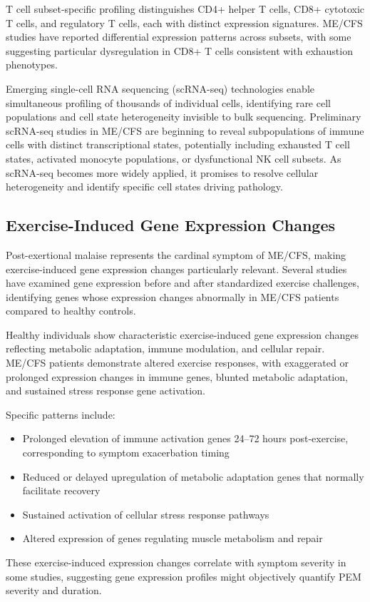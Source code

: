 T cell subset-specific profiling distinguishes CD4+ helper T cells, CD8+ cytotoxic T cells, and regulatory T cells, each with distinct expression signatures. ME/CFS studies have reported differential expression patterns across subsets, with some suggesting particular dysregulation in CD8+ T cells consistent with exhaustion phenotypes.

Emerging single-cell RNA sequencing (scRNA-seq) technologies enable simultaneous profiling of thousands of individual cells, identifying rare cell populations and cell state heterogeneity invisible to bulk sequencing. Preliminary scRNA-seq studies in ME/CFS are beginning to reveal subpopulations of immune cells with distinct transcriptional states, potentially including exhausted T cell states, activated monocyte populations, or dysfunctional NK cell subsets. As scRNA-seq becomes more widely applied, it promises to resolve cellular heterogeneity and identify specific cell states driving pathology.

\subsection{Exercise-Induced Gene Expression Changes}

Post-exertional malaise represents the cardinal symptom of ME/CFS, making exercise-induced gene expression changes particularly relevant. Several studies have examined gene expression before and after standardized exercise challenges, identifying genes whose expression changes abnormally in ME/CFS patients compared to healthy controls.

\begin{observation}
Healthy individuals show characteristic exercise-induced gene expression changes reflecting metabolic adaptation, immune modulation, and cellular repair. ME/CFS patients demonstrate altered exercise responses, with exaggerated or prolonged expression changes in immune genes, blunted metabolic adaptation, and sustained stress response gene activation.

Specific patterns include:
\begin{itemize}
    \item Prolonged elevation of immune activation genes 24--72 hours post-exercise, corresponding to symptom exacerbation timing
    \item Reduced or delayed upregulation of metabolic adaptation genes that normally facilitate recovery
    \item Sustained activation of cellular stress response pathways
    \item Altered expression of genes regulating muscle metabolism and repair
\end{itemize}

These exercise-induced expression changes correlate with symptom severity in some studies, suggesting gene expression profiles might objectively quantify PEM severity and duration.
\end{observation}

